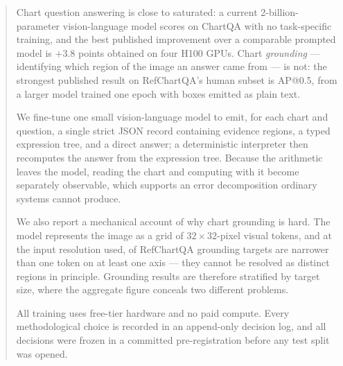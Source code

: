 \begin{abstract}
Chart question answering is close to saturated: a current 2-billion-parameter vision-language model
scores  on ChartQA with no task-specific training, and the best published improvement
over a comparable prompted model is $+3.8$ points obtained on four H100 GPUs. Chart \emph{grounding}
--- identifying which region of the image an answer came from --- is not: the strongest published
result on RefChartQA's human subset is  AP@0.5, from a larger model trained one epoch
with boxes emitted as plain text.

We fine-tune one small vision-language model to emit, for each chart and question, a single strict
JSON record containing evidence regions, a typed expression tree, and a direct answer; a
deterministic interpreter then recomputes the answer from the expression tree. Because the
arithmetic leaves the model, reading the chart and computing with it become separately observable,
which supports an error decomposition ordinary systems cannot produce.


We also report a mechanical account of why chart grounding is hard. The model represents the image
as a grid of $32\times32$-pixel visual tokens, and at the input resolution used,  of
RefChartQA grounding targets are narrower than one token on at least one axis --- they cannot be
resolved as distinct regions in principle. Grounding results are therefore stratified by target
size, where the aggregate figure conceals two different problems.

All training uses free-tier hardware and no paid compute. Every methodological choice is recorded in
an append-only decision log, and all decisions were frozen in a committed pre-registration before
any test split was opened.
\end{abstract}
